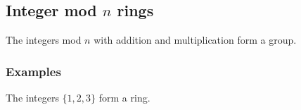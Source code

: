 
\subsection{Integer mod \(n\) rings}

The integers mod \(n\) with addition and multiplication form a group.

\subsubsection{Examples}

The integers \(\{1,2,3\}\) form a ring.

